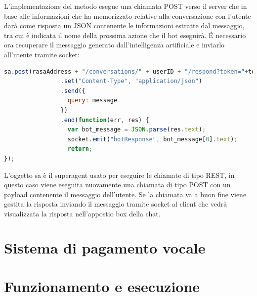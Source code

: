 L'implementazione del metodo esegue una chiamata POST verso il server che in base alle informazioni che ha memorizzato relative alla conversazione con l'utente darà come risposta un JSON contenente le informazioni estratte dal messaggio, tra cui è indicata il nome della prossima azione che il bot eseguirà.
\'E necessario ora recuperare il messaggio generato dall'intelligenza artificiale e inviarlo all'utente tramite socket:
\begin{lstlisting}[language=JavaScript]
sa.post(rasaAddress + "/conversations/" + userID + "/respond?token="+token)
                .set("Content-Type", "application/json")
                .send({
                  query: message
                })
                .end(function(err, res) {
                  var bot_message = JSON.parse(res.text);
                  socket.emit("botResponse", bot_message[0].text);
                  return;
});
\end{lstlisting}
L'oggetto sa è il superagent usato per eseguire le chiamate di tipo REST, in questo caso viene eseguita nuovamente una chiamata di tipo POST con un payload contenente il messaggio dell'utente. Se la chiamata va a buon fine viene gestita la risposta inviando il messaggio tramite socket al client che vedrà visualizzata la risposta nell'appostio box della chat.

\section{Sistema di pagamento vocale}

\section{Funzionamento e esecuzione}

